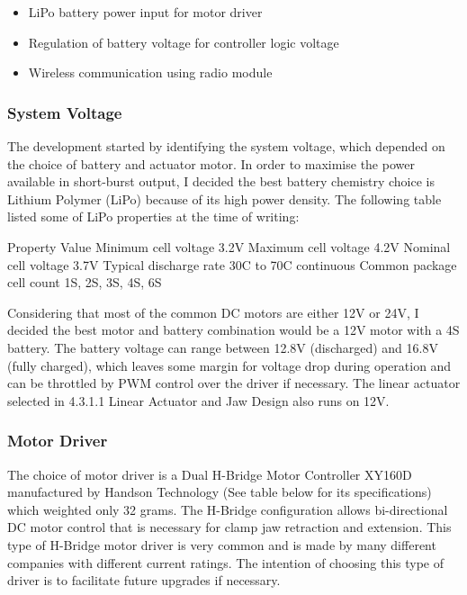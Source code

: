 \begin{itemize}
    \item LiPo battery power input for motor driver
    \item Regulation of battery voltage for controller logic voltage
    \item Wireless communication using radio module
\end{itemize}

\subsubsection{System Voltage}
\label{subsubsection:exploration_1_system_voltage}

The development started by identifying the system voltage, which depended on the choice of battery and actuator motor. In order to maximise the power available in short-burst output, I decided the best battery chemistry choice is Lithium Polymer (LiPo) because of its high power density. The following table listed some of LiPo properties at the time of writing:

Property
Value
Minimum cell voltage
3.2V
Maximum cell voltage
4.2V
Nominal cell voltage
3.7V
Typical discharge rate
30C to 70C continuous
Common package cell count
1S, 2S, 3S, 4S, 6S

Considering that most of the common DC motors are either 12V or 24V, I decided the best motor and battery combination would be a 12V motor with a 4S battery. The battery voltage can range between 12.8V (discharged) and 16.8V (fully charged), which leaves some margin for voltage drop during operation and can be throttled by PWM control over the driver if necessary. The linear actuator selected in 4.3.1.1 Linear Actuator and Jaw Design also runs on 12V.

\subsubsection{Motor Driver}
\label{subsubsection:exploration_1_motor_driver}

The choice of motor driver is a Dual H-Bridge Motor Controller XY160D manufactured by Handson Technology (See table below for its specifications) which weighted only 32 grams. The H-Bridge configuration allows bi-directional DC motor control that is necessary for clamp jaw retraction and extension. This type of H-Bridge motor driver is very common and is made by many different companies with different current ratings. The intention of choosing this type of driver is to facilitate future upgrades if necessary. 

